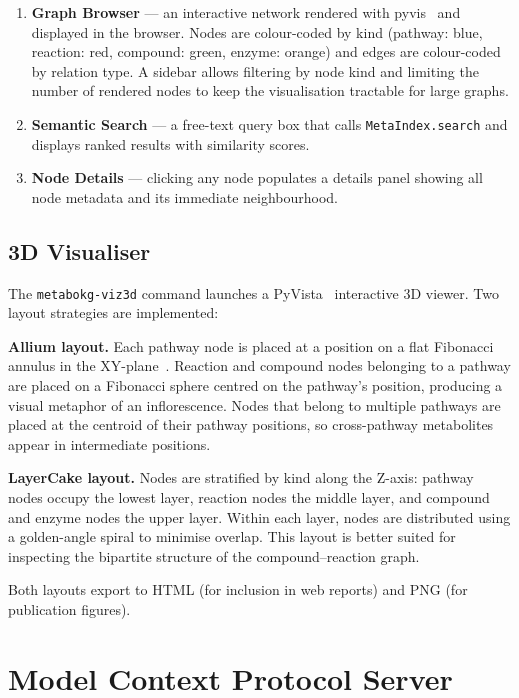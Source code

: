 \documentclass[10pt]{article}
\begin{document}
\begin{enumerate}[leftmargin=*,itemsep=2pt]
  \item \textbf{Graph Browser} --- an interactive network rendered with
    pyvis~\citep{pyvis2021} and displayed in the browser. Nodes are
    colour-coded by kind (pathway: blue, reaction: red, compound: green,
    enzyme: orange) and edges are colour-coded by relation type. A sidebar
    allows filtering by node kind and limiting the number of rendered nodes
    to keep the visualisation tractable for large graphs.
  \item \textbf{Semantic Search} --- a free-text query box that calls
    \texttt{MetaIndex.search} and displays ranked results with similarity
    scores.
  \item \textbf{Node Details} --- clicking any node populates a details
    panel showing all node metadata and its immediate neighbourhood.
\end{enumerate}

\subsection{3D Visualiser}

The \texttt{metabokg-viz3d} command launches a PyVista~\citep{sullivan2019pyvista}
interactive 3D viewer. Two layout strategies are implemented:

\textbf{Allium layout.} Each pathway node is placed at a position on a flat
Fibonacci annulus in the XY-plane~\citep{vogel1979fibonacci}. Reaction and
compound nodes belonging to a pathway are placed on a Fibonacci sphere
centred on the pathway's position, producing a visual metaphor of an
inflorescence. Nodes that belong to multiple pathways are placed at the
centroid of their pathway positions, so cross-pathway metabolites appear in
intermediate positions.

\textbf{LayerCake layout.} Nodes are stratified by kind along the Z-axis:
pathway nodes occupy the lowest layer, reaction nodes the middle layer,
and compound and enzyme nodes the upper layer. Within each layer, nodes
are distributed using a golden-angle spiral to minimise overlap. This
layout is better suited for inspecting the bipartite structure of the
compound--reaction graph.

Both layouts export to HTML (for inclusion in web reports) and PNG
(for publication figures).

\section{Model Context Protocol Server}
\label{sec:mcp}
\end{document}
